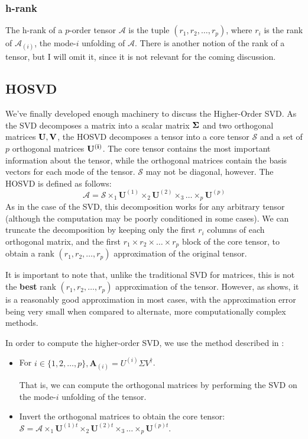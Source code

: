 \documentclass{article}
\begin{document}
\subsubsection{h-rank}
The h-rank of a $p$-order tensor $\mathcal{A}$ is the tuple $(r_1, r_2, \dots, r_p)$, where $r_i$ is the rank of $\mathcal{A}_{(i)}$, the mode-$i$ unfolding of $\mathcal{A}$. There is another notion of the rank of a tensor, but I will omit it, since it is not relevant for the coming discussion.

\subsection{HOSVD}
We've finally developed enough machinery to discuss the Higher-Order SVD. As the SVD decomposes a matrix into a scalar matrix $\bf \Sigma$ and two orthogonal matrices $\bf U, V$, the HOSVD decomposes a tensor into a core tensor $\mathcal{S}$ and a set of $p$ orthogonal matrices $\bf U^{(i)}$. The core tensor contains the most important information about the tensor, while the orthogonal matrices contain the basis vectors for each mode of the tensor. $\mathcal{S}$ may not be diagonal, however. The HOSVD is defined as follows:
\begin{equation*}
	\mathcal{A} = \mathcal{S} \times_1 \mathbf{U}^{(1)} \times_2 \mathbf{U}^{(2)} \times_3 \dots \times_p \mathbf{U}^{(p)}
\end{equation*}
As in the case of the SVD, this decomposition works for any arbitrary tensor (although the computation may be poorly conditioned in some cases). We can truncate the decomposition by keeping only the first $r_i$ columns of each orthogonal matrix, and the first $r_1 \times r_2 \times \dots \times r_p$ block of the core tensor, to obtain a rank $(r_1, r_2, \dots, r_p)$ approximation of the original tensor.\bigskip

It is important to note that, unlike the traditional SVD for matrices, this is not the \textbf{best} rank $(r_1, r_2, \dots, r_p)$ approximation of the tensor. However, as \cite{HOSVD} shows, it is a reasonably good approximation in most cases, with the approximation error being very small when compared to alternate, more computationally complex methods.\bigskip

In order to compute the higher-order SVD, we use the method described in \cite{synthesis}:
\begin{itemize}
	\item For $i \in \{1, 2, \dots, p\}, \mathbf{A}_{(i)} = U^{(i)} \Sigma V^\dag$.
	
	That is, we can compute the orthogonal matrices by performing the SVD on the mode-$i$ unfolding of the tensor.
	\item Invert the orthogonal matrices to obtain the core tensor: $\mathcal{S} = \mathcal{A} \times_1 \mathbf{U}^{(1)t} \times_2 \mathbf{U}^{(2)t} \times_3 \dots \times_p \mathbf{U}^{(p)t}$.
\end{itemize}
\end{document}
